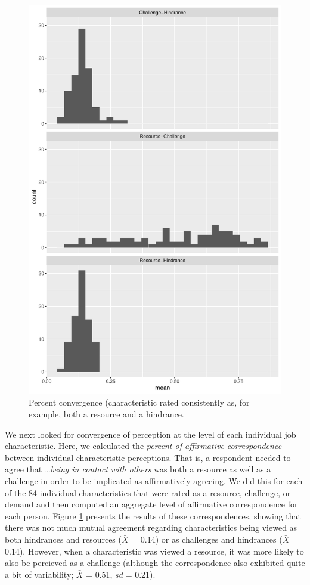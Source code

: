 \documentclass[
  man]{apa6}
\begin{document}
\begin{figure}
\centering
\includegraphics{convergence_files/figure-latex/percagree-1.pdf}
\caption{\label{fig:percagree}Percent convergence (characteristic rated consistently as, for example, both a resource and a hindrance.}
\end{figure}

We next looked for convergence of perception at the level of each individual job characteristic. Here, we calculated the \emph{percent of affirmative correspondence} between individual characteristic perceptions. That is, a respondent needed to agree that \emph{\ldots being in contact with others} was both a resource as well as a challenge in order to be implicated as affirmatively agreeing. We did this for each of the 84 individual characteristics that were rated as a resource, challenge, or demand and then computed an aggregate level of affirmative correspondence for each person. Figure \ref{fig:percagree} presents the results of these correspondences, showing that there was not much mutual agreement regarding characteristics being viewed as both hindrances and resources (\(\bar{X}\) = 0.14) or as challenges and hindrances
(\(\bar{X}\) = 0.14). However, when a characteristic was viewed a resource, it was more likely to also be percieved as a challenge (although the correspondence also exhibited quite a bit of variability; \(\bar{X}\) = 0.51, \emph{sd} = 0.21).
\end{document}
